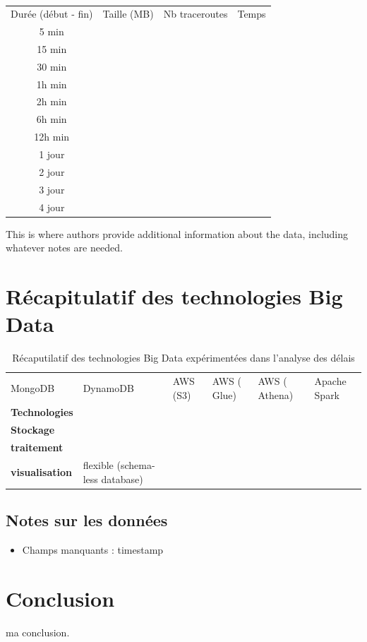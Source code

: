 \begin{table}
\begin{threeparttable}
	\begin{tabular}{cccc}
Durée (début - fin) & Taille (MB) & Nb traceroutes & Temps \\
5 min&&&\\
15 min&&&\\
30 min&&&\\
1h min&&&\\
2h min&&&\\
6h min&&&\\
12h min&&&\\
1 jour&&&\\
2 jour&&&\\
3 jour&&&\\
4 jour&&&\\
	\end{tabular}
    \begin{tablenotes}
	\small
	\item This is where authors provide additional information about
	the data, including whatever notes are needed.
\end{tablenotes}
\end{threeparttable}
\caption{}
\label{}
\end{table}



\section{Récapitulatif des technologies Big Data}

\begin{landscape}
	\begin{table}
		\centering
\begin{tabularx}{24cm}{ X X X XXX}
	
	
	
	MongoDB&DynamoDB &AWS (S3) &AWS ( Glue) &AWS ( Athena) &Apache Spark\\
	
	\textbf{Technologies}&&&&&\\
	
	 \textbf{Stockage} &&&&&\\
	 \textbf{traitement}&&&&&\\
	 \textbf{visualisation}&	  \LeftThumbsUp  flexible (schema-less database)
	 
	   \RightThumbsDown&&&&\\
  
\end{tabularx}
\caption{Récaputilatif des technologies Big Data expérimentées dans l'analyse des délais}
	\end{table}
\end{landscape}

\subsection{Notes sur les données}
\begin{itemize}
	\item Champs manquants : timestamp
\end{itemize}
\section{Conclusion}
ma conclusion.